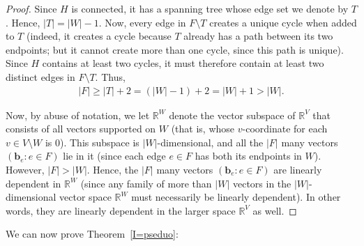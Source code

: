 \documentclass[12pt]{article}
\theoremstyle{definition}
\theoremstyle{remark}
\newcommand{\tup}[1]{\left( #1 \right)}
\begin{document}
\begin{proof}
Since $H$ is connected, it has a spanning tree whose edge set we denote by $T$. Hence, $|T| = |W|-1$. Now, every edge in $F \setminus T$ creates a unique cycle when added to $T$ (indeed, it creates a cycle because $T$ already has a path between its two endpoints; but it cannot create more than one cycle, since this path is unique). Since $H$ contains at least two cycles, it must therefore contain at least two distinct edges in $F \setminus T$. Thus, \begin{align*}
    |F| \geq |T|+2=(|W|-1)+2 = |W|+1 > |W|.
\end{align*}

Now, by abuse of notation, we let $\mathbb{R}^W$ denote the vector subspace of $\mathbb{R}^V$ that consists of all vectors supported on $W$ (that is, whose $v$-coordinate for each $v \in V \setminus W$ is $0$).
This subspace is $|W|$-dimensional, and all the $|F|$ many vectors $\tup{\mathbf{b}_e : e \in F}$ lie in it (since each edge $e \in F$ has both its endpoints in $W$).
However, $|F| > |W|$. Hence, the $|F|$ many vectors $\tup{\mathbf{b}_e : e \in F}$ are linearly dependent in $\mathbb{R}^W$ (since any family of more than $|W|$ vectors in the $|W|$-dimensional vector space $\mathbb{R}^W$ must necessarily be linearly dependent).
In other words, they are linearly dependent in the larger space $\mathbb{R}^V$ as well.
\end{proof}

We can now prove Theorem~\ref{I=pseduo}:
\end{document}
